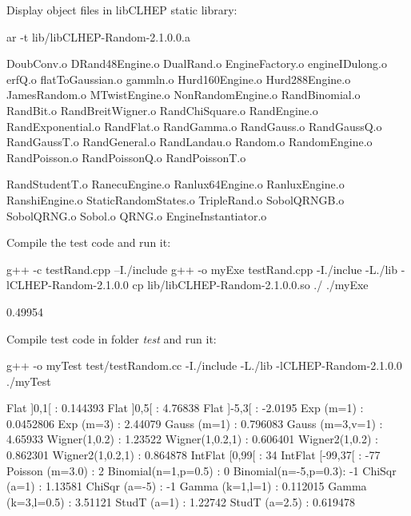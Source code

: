 \documentclass[a4paper, 12pt]{report}
\begin{document}
\begin{enumerate}
        Display object files in libCLHEP static library:
        \begin{commandshell}
ar -t lib/libCLHEP-Random-2.1.0.0.a
        \end{commandshell}
        \begin{messageshell}
DoubConv.o
DRand48Engine.o
DualRand.o
EngineFactory.o
engineIDulong.o
erfQ.o
flatToGaussian.o
gammln.o
Hurd160Engine.o
Hurd288Engine.o
JamesRandom.o
MTwistEngine.o
NonRandomEngine.o
RandBinomial.o
RandBit.o
RandBreitWigner.o
RandChiSquare.o
RandEngine.o
RandExponential.o
RandFlat.o
RandGamma.o
RandGauss.o
RandGaussQ.o
RandGaussT.o
RandGeneral.o
RandLandau.o
Random.o
RandomEngine.o
RandPoisson.o
RandPoissonQ.o
RandPoissonT.o
        \end{messageshell}
        \begin{messageshell}
RandStudentT.o
RanecuEngine.o
Ranlux64Engine.o
RanluxEngine.o
RanshiEngine.o
StaticRandomStates.o
TripleRand.o
SobolQRNGB.o
SobolQRNG.o
Sobol.o
QRNG.o
EngineInstantiator.o
        \end{messageshell}
        Compile the test code and run it:
        \begin{commandshell}
g++ -c testRand.cpp –I./include
g++ -o myExe testRand.cpp -I./inclue -L./lib -lCLHEP-Random-2.1.0.0
cp lib/libCLHEP-Random-2.1.0.0.so ./
./myExe
        \end{commandshell}
        \begin{messageshell}
        0.49954
        \end{messageshell}
        Compile test code in folder \emph{test} and run it:
        \begin{commandshell}
g++ -o myTest test/testRandom.cc -I./include -L./lib -lCLHEP-Random-2.1.0.0 
./myTest
        \end{commandshell}
        \begin{messageshell}
Flat ]0,1[          : 0.144393
 Flat ]0,5[          : 4.76838
 Flat ]-5,3[         : -2.0195
 Exp (m=1)           : 0.0452806
 Exp (m=3)           : 2.44079
 Gauss (m=1)         : 0.796083
 Gauss (m=3,v=1)     : 4.65933
 Wigner(1,0.2)       : 1.23522
 Wigner(1,0.2,1)     : 0.606401
 Wigner2(1,0.2)      : 0.862301
 Wigner2(1,0.2,1)    : 0.864878
 IntFlat [0,99[      : 34
 IntFlat [-99,37[    : -77
 Poisson (m=3.0)     : 2
 Binomial(n=1,p=0.5) : 0
 Binomial(n=-5,p=0.3): -1
 ChiSqr (a=1)        : 1.13581
 ChiSqr (a=-5)       : -1
 Gamma (k=1,l=1)     : 0.112015
 Gamma (k=3,l=0.5)   : 3.51121
 StudT (a=1)         : 1.22742
 StudT (a=2.5)       : 0.619478


\end{messageshell}
\end{enumerate}
\end{document}
